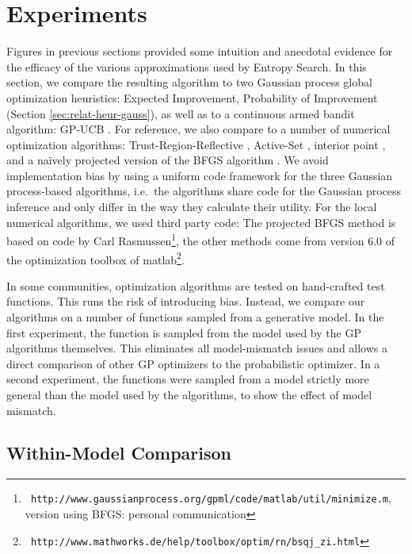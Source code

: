 \documentclass[twoside,11pt]{article}
\begin{document}
\section{Experiments}
\label{sec:loss-functions}

Figures in previous sections provided some intuition and anecdotal
evidence for the efficacy of the various approximations used by
Entropy Search. In this section, we compare the resulting algorithm to
two Gaussian process global optimization heuristics: Expected
Improvement, Probability of Improvement (Section
\ref{sec:relat-heur-gauss}), as well as to a continuous armed bandit
algorithm: GP-UCB \citep{srinivasgaussian}. For reference, we also
compare to a number of numerical optimization algorithms:
Trust-Region-Reflective
\citep{coleman1996interior,coleman1994convergence}, Active-Set
\citep{powell1978fast,powell1978convergence}, interior point
\citep{byrd1999interior,byrd2000trust,waltz2006interior}, and a
na\"ively projected version of the BFGS algorithm
\citep{broyden1965class,fletcher1970new,goldfarb1970family,shanno1970conditioning}.
We avoid implementation bias by using a uniform code framework for the
three Gaussian process-based algorithms, i.e.\ the algorithms share
code for the Gaussian process inference and only differ in the way
they calculate their utility. For the local numerical algorithms, we
used third party code: The projected BFGS method is based on code by
Carl Rasmussen\footnote{{\tt
    http://www.gaussianprocess.org/gpml/code/matlab/util/minimize.m},
  version using BFGS: personal communication}, the other methods come
from version 6.0 of the optimization toolbox of {\sc
  matlab}\footnote{\tt
  http://www.mathworks.de/help/toolbox/optim/rn/bsqj\_zi.html}.

In some communities, optimization algorithms are tested on
hand-crafted test functions. This runs the risk of introducing
bias. Instead, we compare our algorithms on a number of functions
sampled from a generative model. In the first experiment, the function
is sampled from the model used by the GP algorithms themselves. This
eliminates all model-mismatch issues and allows a direct comparison of
other GP optimizers to the probabilistic optimizer. In a second
experiment, the functions were sampled from a model strictly more
general than the model used by the algorithms, to show the effect of
model mismatch.

\subsection{Within-Model Comparison}
\label{sec:model-comparison}
\end{document}
